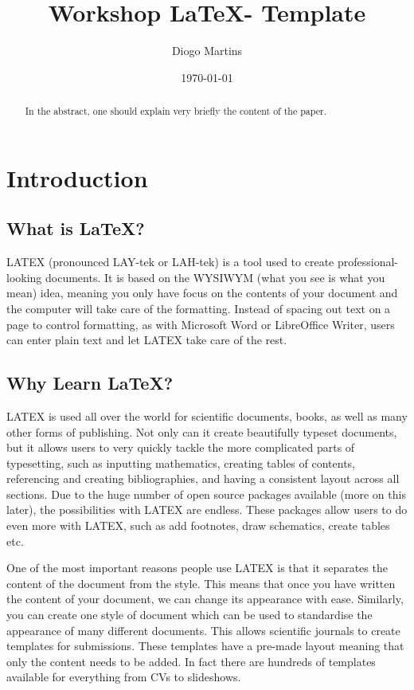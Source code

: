 \documentclass{article}
\title{Workshop \LaTeX - Template} %
\author{Diogo Martins} %
\date{\today} %
\begin{document}
\maketitle %

\begin{abstract}
In the abstract, one should explain very briefly the content of the paper.
\end{abstract}


\tableofcontents %
\newpage %

\section{Introduction}

\subsection{What is \LaTeX?}
LATEX (pronounced LAY-tek or LAH-tek) is a tool used to create professional-looking  documents. It is based on the WYSIWYM (what you see is what you mean) idea, meaning you only have focus on the contents of your document and the computer will take care of the formatting. Instead of spacing out text on a page to control formatting, as with Microsoft Word or LibreOffice Writer, users can enter plain text and let LATEX take care of the rest.


\subsection{Why Learn \LaTeX?}
LATEX is used all over the world for scientific documents, books, as well as many other forms of publishing. Not only can it create beautifully typeset documents, but it allows users to very quickly tackle the more complicated parts of typesetting, such as inputting mathematics, creating tables of contents, referencing and creating bibliographies, and having a consistent layout across all sections. Due to the huge number of open source packages available (more on this later), the possibilities with LATEX are endless. These packages allow users to do even more with LATEX, such as add footnotes, draw schematics, create tables etc.

One of the most important reasons people use LATEX is that it separates the content of the document from the style. This means that once you have written the content of your document, we can change its appearance with ease. Similarly, you can create one style of document which can be used to standardise the appearance of many different documents. This allows scientific journals to create templates for submissions. These templates have a pre-made layout meaning that only the content needs to be added. In fact there are hundreds of templates available for everything from CVs to slideshows.
\end{document}
